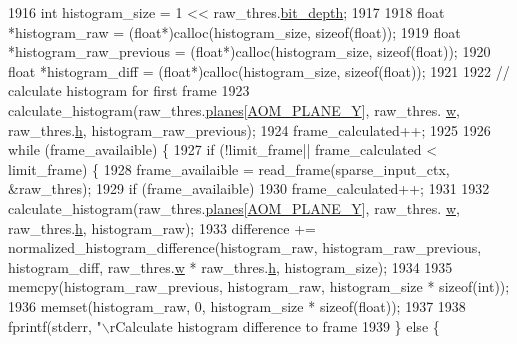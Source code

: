\begin{DoxyCodeInclude}
{{{{{{{{{{{{{{{{{{{{{{{{{{{{{{{{{{{{{{{{{{{{{1916   \textcolor{keywordtype}{int} histogram\_size = 1 << raw\_thres.\hyperlink{structaom__image_a46ed9ffd741938d306a0db5a24bdcf8e}{bit\_depth};
1917 
1918   \textcolor{keywordtype}{float} *histogram\_raw = (\textcolor{keywordtype}{float}*)calloc(histogram\_size, \textcolor{keyword}{sizeof}(\textcolor{keywordtype}{float}));
1919   \textcolor{keywordtype}{float} *histogram\_raw\_previous = (\textcolor{keywordtype}{float}*)calloc(histogram\_size, \textcolor{keyword}{sizeof}(\textcolor{keywordtype}{float}));
1920   \textcolor{keywordtype}{float} *histogram\_diff = (\textcolor{keywordtype}{float}*)calloc(histogram\_size, \textcolor{keyword}{sizeof}(\textcolor{keywordtype}{float}));
1921 
1922   \textcolor{comment}{// calculate histogram for first frame}
1923   calculate\_histogram(raw\_thres.\hyperlink{structaom__image_ac54dbc5237ca2914f9ec30105dfbe302}{planes}[\hyperlink{aom__image_8h_a2ad22076006b15cf809edcaa33f6d339}{AOM\_PLANE\_Y}], raw\_thres.
      \hyperlink{structaom__image_a695141e492ab146dc15e8131827eb237}{w}, raw\_thres.\hyperlink{structaom__image_a3fcffff0a25a4fd9218ed38842014ef2}{h}, histogram\_raw\_previous);
1924   frame\_calculated++;
1925 
1926   \textcolor{keywordflow}{while} (frame\_availaible) \{
1927     \textcolor{keywordflow}{if} (!limit\_frame|| frame\_calculated < limit\_frame) \{
1928       frame\_availaible = read\_frame(sparse\_input\_ctx, &raw\_thres);
1929       \textcolor{keywordflow}{if} (frame\_availaible)
1930         frame\_calculated++;
1931 
1932       calculate\_histogram(raw\_thres.\hyperlink{structaom__image_ac54dbc5237ca2914f9ec30105dfbe302}{planes}[\hyperlink{aom__image_8h_a2ad22076006b15cf809edcaa33f6d339}{AOM\_PLANE\_Y}], raw\_thres.
      \hyperlink{structaom__image_a695141e492ab146dc15e8131827eb237}{w}, raw\_thres.\hyperlink{structaom__image_a3fcffff0a25a4fd9218ed38842014ef2}{h}, histogram\_raw);
1933       difference += normalized\_histogram\_difference(histogram\_raw, histogram\_raw\_previous, histogram\_diff, 
      raw\_thres.\hyperlink{structaom__image_a695141e492ab146dc15e8131827eb237}{w} * raw\_thres.\hyperlink{structaom__image_a3fcffff0a25a4fd9218ed38842014ef2}{h}, histogram\_size);
1934 
1935       memcpy(histogram\_raw\_previous, histogram\_raw, histogram\_size * \textcolor{keyword}{sizeof}(\textcolor{keywordtype}{int}));
1936       memset(histogram\_raw, 0, histogram\_size * \textcolor{keyword}{sizeof}(\textcolor{keywordtype}{float}));
1937 
1938       fprintf(stderr, \textcolor{stringliteral}{"\(\backslash\)rCalculate histogram difference to frame %
1939     \} \textcolor{keywordflow}{else} \{
}}}}}}}}}}}}}}}}}}}}}}}}}}}}}}}}}}}}}}}}}}}}}}
\end{DoxyCodeInclude}
